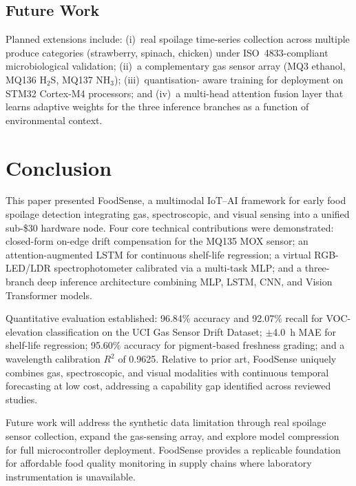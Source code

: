 \documentclass[conference]{IEEEtran}
\begin{document}
\subsection{Future Work}

Planned extensions include: (i)~real spoilage time-series collection
across multiple produce categories (strawberry, spinach, chicken) under
ISO~4833-compliant microbiological validation; (ii)~a complementary gas
sensor array (MQ3 ethanol, MQ136 H$_2$S, MQ137 NH$_3$); (iii)~quantisation-
aware training for deployment on STM32 Cortex-M4 processors; and
(iv)~a multi-head attention fusion layer that learns adaptive weights
for the three inference branches as a function of environmental context.

\section{Conclusion}
\label{sec:conclusion}

This paper presented FoodSense, a multimodal IoT--AI framework for
early food spoilage detection integrating gas, spectroscopic, and
visual sensing into a unified sub-\$30 hardware node. Four core
technical contributions were demonstrated: closed-form on-edge drift
compensation for the MQ135 MOX sensor; an attention-augmented LSTM for
continuous shelf-life regression; a virtual RGB-LED/LDR spectrophotometer
calibrated via a multi-task MLP; and a three-branch deep inference
architecture combining MLP, LSTM, CNN, and Vision Transformer models.

Quantitative evaluation established: 96.84\% accuracy and 92.07\%
recall for VOC-elevation classification on the UCI Gas Sensor Drift
Dataset; $\pm$4.0~h MAE for shelf-life regression; 95.60\% accuracy
for pigment-based freshness grading; and a wavelength calibration $R^2$
of 0.9625. Relative to prior art, FoodSense uniquely combines gas,
spectroscopic, and visual modalities with continuous temporal forecasting
at low cost, addressing a capability gap identified across reviewed
studies.

Future work will address the synthetic data limitation through real
spoilage sensor collection, expand the gas-sensing array, and explore
model compression for full microcontroller deployment. FoodSense
provides a replicable foundation for affordable food quality monitoring
in supply chains where laboratory instrumentation is unavailable.



\end{document}
